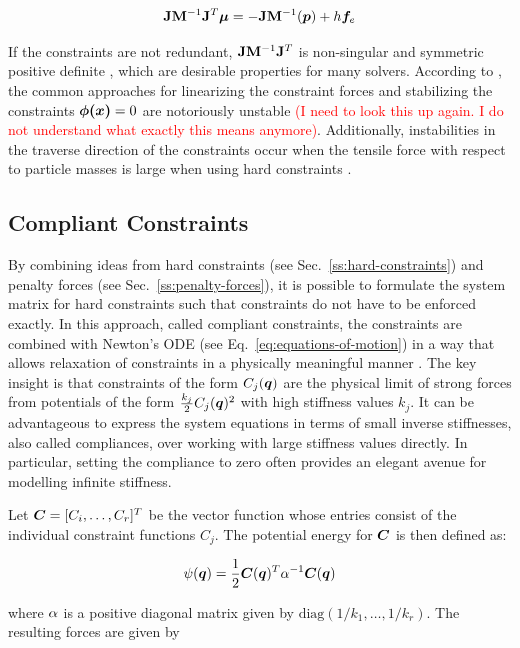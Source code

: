 \[
    \mathbf{J}\mathbf{M}^{-1}\mathbf{J}^T \bm{\mu} = -\mathbf{J}\mathbf{M}^{-1}(\bm{p}) + h \bm{f}_e
\]

If the constraints are not redundant, $\mathbf{J}\mathbf{M}^{-1}\mathbf{J}^T$ is non-singular and symmetric positive definite \cite{baraff1996}, which are desirable
properties for many solvers. According to \cite{servin2006}, the common approaches for linearizing the constraint forces and stabilizing 
the constraints $\bm{\phi(x)} = 0$ are notoriously unstable \textcolor{red}{(I need to look this up again. I do not understand what exactly 
this means anymore)}. Additionally, instabilities in the traverse direction of the constraints occur when the tensile force with respect to 
particle masses is large when using hard constraints \cite{tournier2015}.

\subsection{Compliant Constraints}\label{ss:compliant-constraints}
By combining ideas from hard constraints (see Sec.\ \ref{ss:hard-constraints}) and penalty forces (see Sec.\ \ref{ss:penalty-forces}), it is possible to 
formulate the system matrix for hard constraints such that constraints do not have to be enforced exactly. In this approach, called compliant 
constraints, the constraints are combined with Newton's ODE (see Eq.\ \ref{eq:equations-of-motion}) in a way that allows relaxation of constraints in a 
physically meaningful manner \cite{servin2006}. The key insight is that constraints 
of the form $C_j(\bm{q})$ are the physical limit of strong forces from potentials of the form $\frac{k_j}{2}C_j(\bm{q})^2$ with 
high stiffness values $k_j$. It can be advantageous to express the system equations in terms of small inverse stiffnesses, also 
called compliances, over working with large stiffness values directly. In particular, setting the compliance to zero often provides
an elegant avenue for modelling infinite stiffness. 

Let $\bm{C} = [C_i, \ldots, C_r]^T$ be the vector function whose entries consist of the individual constraint 
functions $C_j$. The potential energy for $\bm{C}$ is then defined as:

\begin{equation}\label{eq:compliant-potential}
    \psi(\bm{q}) = \frac{1}{2}\bm{C}(\bm{q})^T \mathbf{\alpha}^{-1}\bm{C}(\bm{q})
\end{equation}

\noindent where $\mathbf{\alpha}$ is a positive diagonal matrix given by $\text{diag}(1/k_1, \ldots, 1/k_r)$. The resulting forces are given by 

